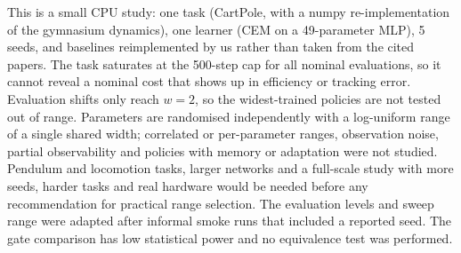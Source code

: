 This is a small CPU study: one task (CartPole, with a numpy re-implementation of the gymnasium dynamics), one learner (CEM on a 49-parameter MLP), 5 seeds, and baselines reimplemented by us rather than taken from the cited papers. The task saturates at the 500-step cap for all nominal evaluations, so it cannot reveal a nominal cost that shows up in efficiency or tracking error. Evaluation shifts only reach $w=2$, so the widest-trained policies are not tested out of range. Parameters are randomised independently with a log-uniform range of a single shared width; correlated or per-parameter ranges, observation noise, partial observability and policies with memory or adaptation were not studied. Pendulum and locomotion tasks, larger networks and a full-scale study with more seeds, harder tasks and real hardware would be needed before any recommendation for practical range selection. The evaluation levels and sweep range were adapted after informal smoke runs that included a reported seed. The gate comparison has low statistical power and no equivalence test was performed.
